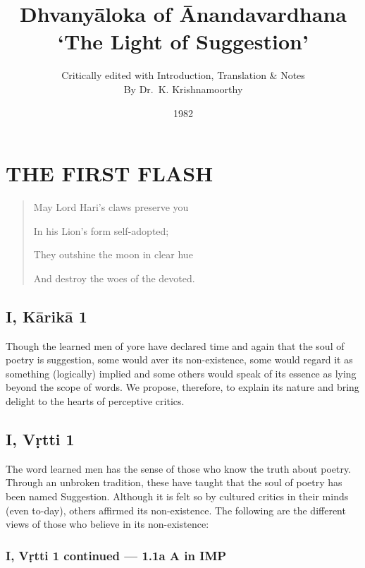 \documentclass[12pt]{book}
\title{Dhvanyāloka of Ānandavardhana \\ `The Light of Suggestion'}
\author{Critically edited with Introduction, Translation \& Notes \\ By Dr.\ K. Krishnamoorthy}
\date{1982}
\begin{document}
\maketitle


\chapter{THE FIRST FLASH}


\begin{quotation}
\begin{em}
May Lord Hari's claws preserve you

In his Lion's form self-adopted;

They outshine the moon in clear hue

And destroy the woes of the devoted.
\end{em}
\end{quotation}



\section{I, Kārikā 1}

Though the learned men of yore have declared time and
again that the soul of poetry is suggestion, some would aver its
non-existence, some would regard it as something (logically)
implied and some others would speak of its essence as lying
beyond the scope of words. We propose, therefore, to explain
its nature and bring delight to the hearts of perceptive critics.


\section{I, Vṛtti 1}

The word learned men has the sense of those who know
the truth about poetry. Through an unbroken tradition, these
have taught that the soul of poetry has been named Suggestion.
Although it is felt so by cultured critics in their minds (even
to-day), others affirmed its non-existence. The following are
the different views of those who believe in its non-existence:


\subsection{I, Vṛtti 1 continued --- 1.1a A in IMP}
\end{document}
